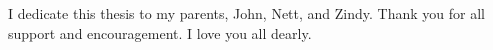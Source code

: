 
I dedicate this thesis to my parents, John, Nett, and Zindy. Thank you for all support and encouragement. I love you all dearly.
